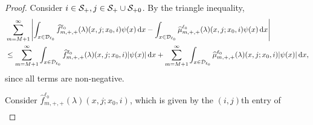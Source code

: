 \begin{proof}
	Consider \(i\in\mathcal{S}_+,j\in\mathcal S_+\cup\mathcal{S}_{+0}\). 
	By the triangle inequality, 
	\begin{align*}
		&\sum_{m=M+1}^\infty \left| \int_{x\in\mathcal{D}_{\ell_0}} \widehat f^{\ell_0}_{m,+,+}(\lambda)(x,j;x_0,i)\psi(x) \, \mathrm{d} x
		-
		 \int_{x\in\mathcal{D}_{\ell_0}} \widehat \mu^{\ell_0}_{m,+,+}(\lambda)(x,j;x_0,i) \psi(x) \, \mathrm{d} x \right|
		\\&\leq\sum_{m=M+1}^\infty \int_{x\in\mathcal{D}_{\ell_0}} \widehat f^{\ell_0}_{m,+,+}(\lambda)(x,j;x_0,i) |\psi(x)| \, \mathrm{d} x
		+\sum_{m=M+1}^\infty \int_{x\in\mathcal{D}_{\ell_0}} \widehat  \mu^{\ell_0}_{m,+,+}(\lambda)(x,j;x_0,i) |\psi(x)| \, \mathrm{d} x,
	\end{align*}
	since all terms are non-negative. 
	
	Consider \(\widehat f^{\ell_0}_{m,+,+}(\lambda)(x,j;x_0,i) \), which is given by the \((i,j)\)th entry of
        \begin{align}

\end{align}
\end{proof}
